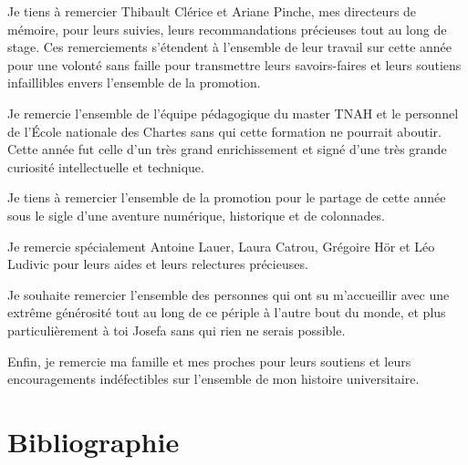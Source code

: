 \documentclass[a4paper,12pt,twoside]{book}
\begin{document}
	Je tiens à remercier Thibault Clérice et Ariane Pinche, mes directeurs de mémoire, pour leurs suivies, leurs recommandations précieuses tout au long de stage. Ces remerciements s'étendent à l'ensemble de leur travail sur cette année pour une volonté sans faille pour transmettre leurs savoirs-faires et leurs soutiens infaillibles envers l'ensemble de la promotion.
	
	Je remercie l'ensemble de l'équipe pédagogique du master TNAH et le personnel de l'École nationale des Chartes sans qui cette formation ne pourrait aboutir. Cette année fut celle d'un très grand enrichissement et signé d'une très grande curiosité intellectuelle et technique.
	
	Je tiens à remercier l'ensemble de la promotion pour le partage de cette année sous le sigle d'une aventure numérique, historique et de colonnades.
	
	Je remercie spécialement Antoine Lauer, Laura Catrou, Grégoire Hör et Léo Ludivic pour leurs aides et leurs relectures précieuses.
	
	Je souhaite remercier l'ensemble des personnes qui ont su m'accueillir avec une extrême générosité tout au long de ce périple à l'autre bout du monde, et plus particulièrement à toi Josefa sans qui rien ne serais possible.
	
	Enfin, je remercie ma famille et mes proches pour leurs soutiens et leurs encouragements indéfectibles sur l'ensemble de mon histoire universitaire. 
	
	\chapter{Bibliographie}
	
	\printbibliography[heading=subbibintoc,keyword=chili,title=Études sociopolitiques autour du Chili]
	\printbibliography[heading=subbibintoc,keyword=histoire,title=Histoire et historiographie des relations Chileno-Mapuche]
	\printbibliography[heading=subbibintoc,keyword=humanites,title=Humanités numériques et science ouverte]
	\printbibliography[heading=subbibintoc,keyword=edition,title=Éditions numériques]
	\printbibliography[heading=subbibintoc,keyword=machinel,title=Généralités autour de l'apprentissage Machine]
	\printbibliography[heading=subbibintoc,keyword=htr,title=Reconnaissance d'écriture manuscrite]
	\printbibliography[heading=subbibintoc,keyword=nlp,title=Traitement automatique du langage]
	\printbibliography[heading=subbibintoc,keyword=ner,title=Reconnaissance d'entités nommées]
	\printbibliography[heading=subbibintoc,keyword=semantic,title=Le web sémantique]
	\printbibliography[heading=subbibintoc,keyword=codes,title=Codes et scripts produits durant le stage]
	
\end{document}
